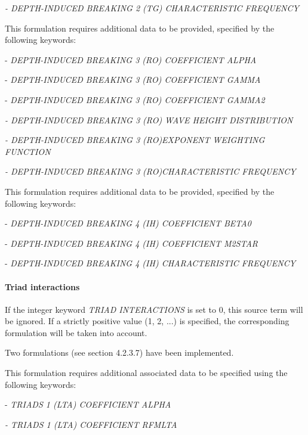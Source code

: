  \textit{- DEPTH-INDUCED BREAKING 2 (TG) CHARACTERISTIC FREQUENCY}

 \textbf{}

 \textbf{}

 This formulation requires additional data to be provided, specified by the following keywords:

 - \textit{DEPTH-INDUCED BREAKING 3 (RO) COEFFICIENT ALPHA}

 - \textit{DEPTH-INDUCED BREAKING 3 (RO) COEFFICIENT GAMMA}

 - \textit{DEPTH-INDUCED BREAKING 3 (RO) COEFFICIENT GAMMA2}

 \textit{- DEPTH-INDUCED BREAKING 3 (RO) WAVE HEIGHT DISTRIBUTION}

 \textit{- DEPTH-INDUCED BREAKING 3 (RO)EXPONENT WEIGHTING FUNCTION}

 \textit{- DEPTH-INDUCED BREAKING 3 (RO)CHARACTERISTIC FREQUENCY}

 \textbf{}

 \textbf{}

 This formulation requires additional data to be provided, specified by the following keywords:

 - \textit{DEPTH-INDUCED BREAKING 4 (IH) COEFFICIENT BETA0}

 - \textit{DEPTH-INDUCED BREAKING 4 (IH) COEFFICIENT M2STAR}

 - \textit{DEPTH-INDUCED BREAKING 4 (IH) CHARACTERISTIC FREQUENCY}

\paragraph{ Triad interactions}

 If the integer keyword \textit{TRIAD INTERACTIONS} is set to 0, this source term will be ignored. If a strictly positive value (1, 2, ...) is specified, the corresponding formulation will be taken into account.

 Two formulations (see section 4.2.3.7) have been implemented.

 \textbf{}

 This formulation requires additional associated data to be specified using the following keywords:

 - \textit{TRIADS 1 (LTA) COEFFICIENT ALPHA }

 \textit{- TRIADS 1 (LTA) COEFFICIENT RFMLTA }

 \textbf{}

